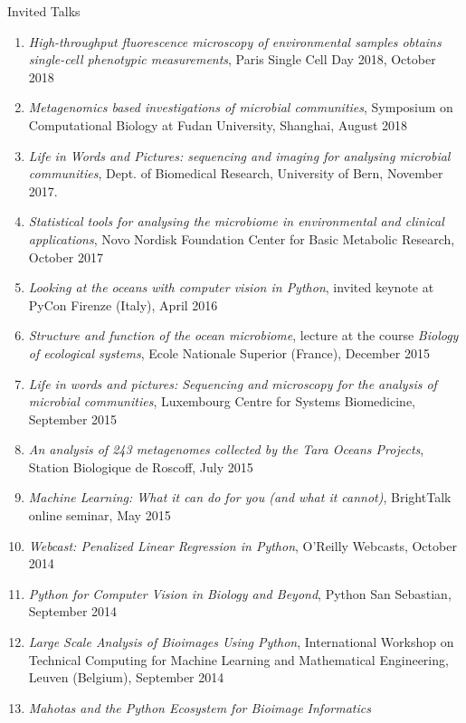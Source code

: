 \documentclass{article}
\renewcommand\subsection[1]{%
    \par\vspace{.1em}%
    {\hspace{1em}\subsubhead #1}%
    \par\vspace{.2em}%
}
\begin{document}
\subsection{Invited Talks}
\begin{enumerate}
\item \emph{High-throughput fluorescence microscopy of environmental samples
    obtains single-cell phenotypic measurements}, Paris Single Cell Day 2018,
    October 2018
\item \emph{Metagenomics based investigations of microbial communities},
    Symposium on Computational Biology at Fudan University, Shanghai, August
    2018
\item \emph{Life in Words and Pictures: sequencing and imaging for analysing
    microbial communities}, Dept. of Biomedical Research, University of Bern,
    November 2017.
\item \emph{Statistical tools for analysing the microbiome in environmental and
    clinical applications}, Novo Nordisk Foundation Center for Basic Metabolic
    Research, October 2017
\item \emph{Looking at the oceans with computer vision in Python}, invited
    keynote at PyCon Firenze (Italy), April 2016
\item \emph{Structure and function of the ocean microbiome}, lecture at the
    course \textit{Biology of ecological systems}, Ecole Nationale Superior
    (France), December 2015
\item \emph{Life in words and pictures: Sequencing and microscopy for the analysis
    of microbial communities}, Luxembourg Centre for Systems Biomedicine,
    September 2015
\item \emph{An analysis of 243 metagenomes collected by the Tara Oceans
    Projects}, Station Biologique de Roscoff, July 2015
\item \emph{Machine Learning: What it can do for you (and what it cannot)},
    BrightTalk online seminar, May 2015
\item \emph{Webcast: Penalized Linear Regression in Python}, O'Reilly Webcasts,
    October 2014
\item \emph{Python for Computer Vision in Biology and Beyond}, Python San
    Sebastian, September 2014
\item \emph{Large Scale Analysis of Bioimages Using Python}, International
    Workshop on Technical Computing for Machine Learning and Mathematical
    Engineering, Leuven (Belgium), September 2014
\item \emph{Mahotas and the Python Ecosystem for Bioimage Informatics
}
\end{enumerate}
\end{document}
